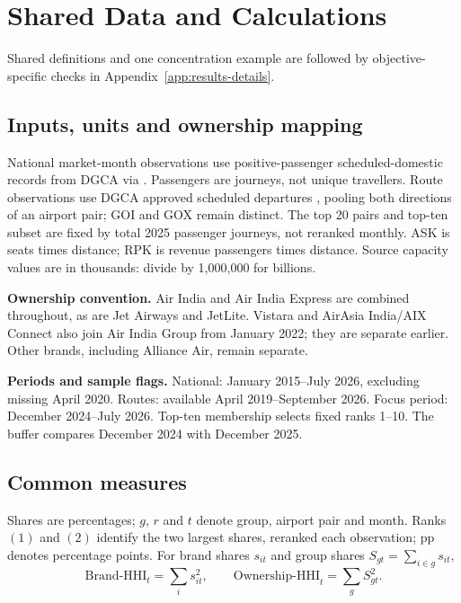 \section{Shared Data and Calculations}
\label{app:shared-calculations}
\label{app:o4-dictionary}
\label{app:variable-dictionary}
Shared definitions and one concentration example are followed by objective-specific checks in Appendix~\ref{app:results-details}.
\label{app:team-variables}
\subsection{Inputs, units and ownership mapping}
\label{app:o4-input-definitions}
National market-month observations use positive-passenger scheduled-domestic records from DGCA via \textcite{kubicek2026aviationstats}. Passengers are journeys, not unique travellers. Route observations use DGCA approved scheduled departures \parencite{dgcaDomesticSchedules}, pooling both directions of an airport pair; GOI and GOX remain distinct. The top 20 pairs and top-ten subset are fixed by total 2025 passenger journeys, not reranked monthly. ASK is seats times distance; RPK is revenue passengers times distance. Source capacity values are in thousands: divide by 1,000,000 for billions.

\textbf{Ownership convention.} Air India and Air India Express are combined throughout, as are Jet Airways and JetLite. Vistara and AirAsia India/AIX Connect also join Air India Group from January 2022; they are separate earlier. Other brands, including Alliance Air, remain separate.

\textbf{Periods and sample flags.} National: January 2015--July 2026, excluding missing April 2020. Routes: available April 2019--September 2026. Focus period: December 2024--July 2026. Top-ten membership selects fixed ranks 1--10. The buffer compares December 2024 with December 2025.

\subsection{Common measures}
\label{app:o4-measure-definitions}
Shares are percentages; $g$, $r$ and $t$ denote group, airport pair and month. Ranks $(1)$ and $(2)$ identify the two largest shares, reranked each observation; pp denotes percentage points. For brand shares $s_{it}$ and group shares $S_{gt}=\sum_{i\in g}s_{it}$,
\begin{equation}
\mathrm{Brand\mbox{-}HHI}_t=\sum_i s_{it}^2,\qquad
\mathrm{Ownership\mbox{-}HHI}_t=\sum_g S_{gt}^2.
\tag{A.1}\label{eq:review-o1-indices}
\end{equation}

